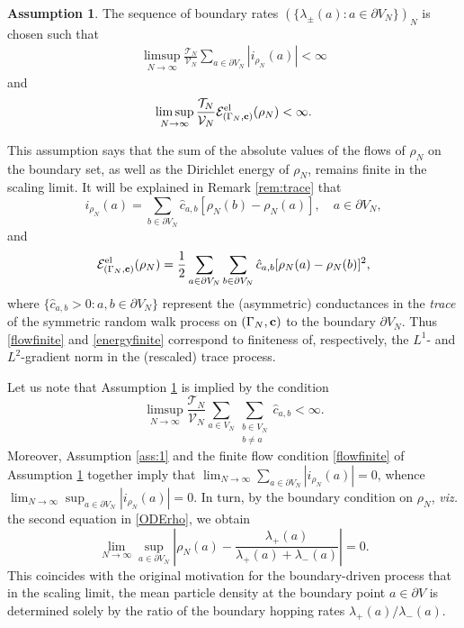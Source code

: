 \documentclass[11pt]{amsart}
\theoremstyle{plain}
\theoremstyle{definition}
\newtheorem{assumption}{Assumption}
\theoremstyle{remark}
\begin{document}
\begin{assumption}
The sequence of boundary rates $(\{\lambda_\pm(a): a\in \partial V_N\})_N$ is chosen such that
\label{ass:boundaryscaling}
\begin{align}
\label{flowfinite}
  \limsup_{N\to\infty} \frac{\mathcal{T}_N}{\mathcal{V}_N} \sum_{a\in \partial V_N} |i_{\rho_N}(a)| <\infty
 \end{align}
 and
 \begin{align} 
 \label{energyfinite}
 \limsup_{N\to\infty} \frac{\mathcal{T}_N}{\mathcal{V}_N} \mathcal{E}^{\rm el}_{(\Gamma_N,{\bf c})}(\rho_N) < \infty.
\end{align}
\end{assumption}

This assumption says that the sum of the absolute values of the flows of $\rho_N$ on the boundary set, as well as the Dirichlet energy of $\rho_N$, remains finite in the scaling limit. It will be explained in Remark \ref{rem:trace} that
\[
i_{\rho_N}(a) = \sum_{b\in \partial V_N} \hat{c}_{a,b} [\rho_N(b)-\rho_N(a)], \quad a\in \partial V_N,
\]
and
\[
 \mathcal{E}^{\rm el}_{(\Gamma_N,{\bf c})}(\rho_N) = \frac{1}{2} \sum_{a\in \partial V_N} \sum_{b\in\partial V_N} \hat{c}_{a,b} [\rho_N(a)-\rho_N(b)]^2,
\]
where $\{\hat{c}_{a,b}>0:a,b\in \partial V_N\}$ represent the (asymmetric) conductances in the \emph{trace} of the symmetric random walk process on $(\Gamma_N, {\bf c})$ to the boundary $\partial V_N$. Thus \eqref{flowfinite} and \eqref{energyfinite} correspond to finiteness of, respectively, the $L^1$- and $L^2$-gradient norm in the (rescaled) trace process.

Let us note that Assumption \ref{ass:boundaryscaling} is implied by the condition
\[
\limsup_{N\to\infty} \frac{\mathcal{T}_N}{\mathcal{V}_N} \sum_{a\in V_N} \sum_{\substack{b\in V_N\\ b\neq a}} \hat{c}_{a,b} < \infty.
\]
Moreover, Assumption \ref{ass:1} and the finite flow condition \eqref{flowfinite} of Assumption \ref{ass:boundaryscaling} together imply that $\lim_{N\to\infty} \sum_{a\in \partial V_N} |i_{\rho_N}(a)|=0$, whence $\lim_{N\to\infty} \sup_{a \in \partial V_N} |i_{\rho_N}(a)|=0$. In turn, by the boundary condition on $\rho_N$, \emph{viz.\@} the second equation in \eqref{ODErho}, we obtain
\[
\lim_{N\to\infty} \sup_{a\in \partial V_N} \left| \rho_N(a) - \frac{\lambda_+(a)}{\lambda_+(a) + \lambda_-(a)} \right| =0.
\]
This coincides with the original motivation for the boundary-driven process that in the scaling limit, the mean particle density at the boundary point $a\in \partial V$ is determined solely by the ratio of the boundary hopping rates $\lambda_+(a)/\lambda_-(a)$.
\end{document}
